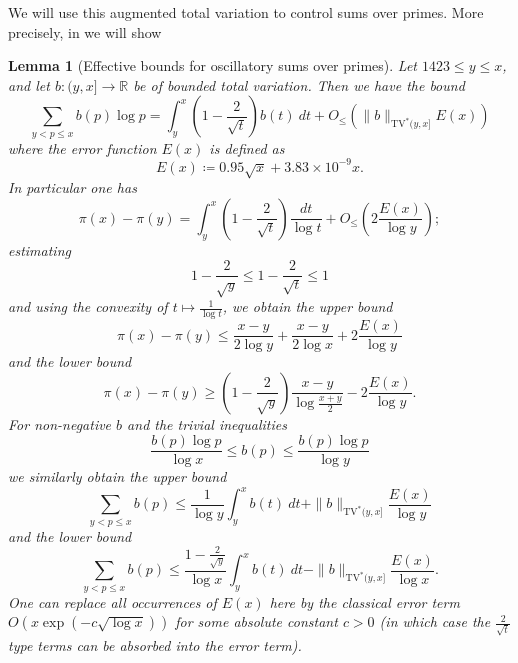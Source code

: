 \documentclass[10pt,a4paper,reqno]{amsart}
\numberwithin{equation}{section}
\theoremstyle{plain}
\newtheorem{lemma}[theorem]{Lemma}
\theoremstyle{definition}
\newcommand\R{\mathbb{R}}
\begin{document}
We will use this augmented total variation to control sums over primes.  More precisely, in  we will show

\begin{lemma}[Effective bounds for oscillatory sums over primes]\label{osc-lemma}  Let $1423 \leq y \leq x$, and let $b: (y,x] \to \R$ be of bounded total variation.  Then we have the bound
\begin{equation}\label{bv-exact}
    \sum_{y < p \leq x} b(p) \log p = \int_y^x \left(1-\frac{2}{\sqrt{t}}\right) b(t)\ dt + O_{\leq}(\|b\|_{\mathrm{TV}^*(y,x]} E(x))
\end{equation}
where the error function $E(x)$ is defined as
\begin{equation}\label{tilde-e}
  E(x) \coloneqq 0.95 \sqrt{x} + 3.83 \times 10^{-9} x.
\end{equation}
In particular one has
\begin{equation}\label{pix}
  \pi(x) - \pi(y) = \int_y^x \left(1-\frac{2}{\sqrt{t}}\right)\frac{dt}{\log t} + O_\leq\left(2 \frac{E(x)}{\log y}\right);
\end{equation}
estimating
$$ 1-\frac{2}{\sqrt{y}} \leq 1-\frac{2}{\sqrt{t}} \leq 1$$
and using the convexity of $t \mapsto \frac{1}{\log t}$, we obtain the upper bound
\begin{equation}\label{pixy-upper}
 \pi(x) - \pi(y) \leq \frac{x-y}{2\log y} + \frac{x-y}{2\log x} + 2 \frac{E(x)}{\log y}
\end{equation}
and the lower bound
\begin{equation}\label{pixy-lower}
  \pi(x) - \pi(y) \geq \left(1-\frac{2}{\sqrt{y}}\right) \frac{x-y}{\log \frac{x+y}{2}} - 2 \frac{E(x)}{\log y}.
\end{equation}
For non-negative $b$ and the trivial inequalities
$$ \frac{b(p) \log p}{\log x}  \leq b(p) \leq \frac{b(p) \log p}{\log y} $$
we similarly obtain the upper bound
\begin{equation}\label{bv-upper}
   \sum_{y < p \leq x} b(p) \leq \frac{1}{\log y} \int_y^x b(t)\ dt + \|b\|_{\mathrm{TV}^*(y,x]} \frac{E(x)}{\log y}
\end{equation}
and the lower bound
\begin{equation}\label{bv-lower}
  \sum_{y < p \leq x} b(p) \leq \frac{1-\frac{2}{\sqrt{y}}}{\log x} \int_y^x b(t)\ dt - \|b\|_{\mathrm{TV}^*(y,x]} \frac{E(x)}{\log x}.
\end{equation}
One can replace all occurrences of $E(x)$ here by the classical error term $O(x \exp(-c \sqrt{\log x}))$ for some absolute constant $c>0$ (in which case the $\frac{2}{\sqrt{t}}$ type terms can be absorbed into the error term).
\end{lemma}
\end{document}

